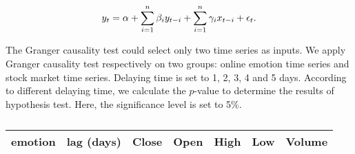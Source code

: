 \documentclass[aps,preprint,groupedaddress]{revtex4-1}
\begin{document}
\begin{equation}
 y_{t} = \alpha + \sum_{i=1}^{n} \beta_{i}y_{t-i} + \sum_{i=1}^{n} \gamma_{i}x_{t-i} + \epsilon_{t}. \\ 
\label{eq:granger_2}
\end{equation}

The Granger causality test could select only two time series as inputs. We apply Granger causality test respectively on two groups: online emotion time series and stock market time series. Delaying time is set to 1, 2, 3, 4 and 5 days. According to different delaying time, we calculate the $p$-value to determine the results of hypothesis test. Here, the significance level is set to 5\%.

\begin{table*}[!t]
\centering
\caption{{\color{black}{Results of Granger causality test of online emotion and stock market time series. Only significant results are listed because of the limited space. $p$-value$<0.05$: *, $p$-value$<0.01$: **, $p$-value$<0.001$: ***.}}}
\label{tab:granger_causality_test}
\begin{tabular}{c|c|lllll}
\hline
\textbf{emotion}          & \textbf{lag (days)} & \textbf{Close} & \textbf{Open} & \textbf{High} & \textbf{Low} & \textbf{Volume} \\ \hline


\end{tabular}
\end{table*}
\end{document}
